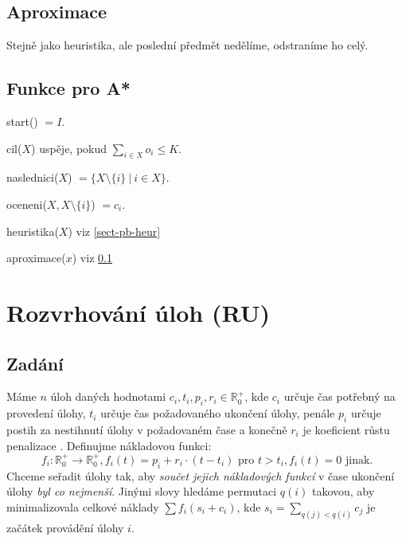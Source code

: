 \documentclass[12pt,notitlepage,fleqn]{report} %
\theoremstyle{definition}
\def\|{\:|\:}
\def\R+{\mathbb{R}_0^+}
\newcommand{\suma}[2]{\sum\limits_{#1}^{#2}}
\begin{document}
    \subsection{Aproximace}
    \label{sect-pb-aprox}
    Stejně jako heuristika, ale poslední předmět nedělíme, odstraníme ho celý.

    \subsection{Funkce pro A*}
    \label{sect-pb-func}
    \begin{compactdesc}
     \item[start()] $=I$.
     \item[cil($X$)] uspěje, pokud  $\suma{i \in X}{} o_i \leq K$.
     \item[naslednici($X$)] $= \{ X \setminus \{ i \} \| i \in X \}$.
     \item[oceneni($X,X \setminus \{ i \}$)] $=c_i$.
     \item[heuristika($X$)] viz \ref{sect-pb-heur}
     \item[aproximace($x$)] viz \ref{sect-pb-aprox}
    \end{compactdesc}

    

  \section{Rozvrhování úloh (RU)}
    \subsection{Zadání}

Máme $n$ úloh daných hodnotami $c_i, t_i, p_i, r_i \in \R+$, kde $c_i$ určuje čas potřebný na provedení úlohy, $t_i$ určuje čas požadovaného ukončení úlohy, penále $p_i$ určuje postih za nestihnutí úlohy v požadovaném čase a konečně $r_i$ je koeficient růstu penalizace . Definujme nákladovou funkci:
\[ f_i : \R+ \to \R+, f_i(t) = p_i + r_i \cdot (t-t_i) \mbox{ pro } t>t_i, f_i(t)=0 \mbox{ jinak}.\] 
Chceme seřadit úlohy tak, aby \emph{součet jejich nákladových funkcí} v čase ukončení úlohy \emph{byl co nejmenší}. Jinými slovy hledáme permutaci $q(i)$ takovou, aby minimalizovala celkové náklady $\sum f_i(s_i + c_i)$, kde $s_i=\suma{q(j)<q(i)}{} c_j$ je začátek provádění úlohy $i$.
\end{document}
